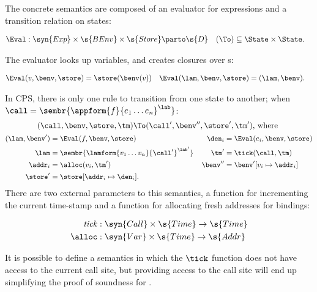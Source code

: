 The concrete semantics are composed of an evaluator for expressions
and a transition relation on states:
\begin{small}\begin{align*}
  \Eval &: \syn{Exp} \times \s{BEnv} \times \s{Store} \parto \s{D}
  &
  (\To) &\subseteq \State \times \State
  \text.
\end{align*}\end{small}The evaluator looks up variables, and creates closures over \lamterm s:
\begin{small}\begin{align*}
  \Eval(v,\benv,\store) &= \store(\benv(v))
  &
  \Eval(\lam,\benv,\store) &= (\lam,\benv)
  \text.
\end{align*}\end{small}In CPS, there is only one rule to transition from one state to another;
when $\call = \sembr{\appform{f}{e_1 \ldots e_n}^\lab}$:
\begin{gather*}
  (\call,\benv,\store,\tm) 
  \To
  (\call',\benv'',\store',\tm')\text{, where }\\
\begin{small}\begin{align*}
  (\lam,\benv') &= \Eval(f,\benv,\store)
  &
  \den_i &= \Eval(e_i,\benv,\store)
  \\
  \lam &= \sembr{\lamform{v_1 \ldots v_n}{\call'}^{\lab'}}
  &
  \tm' &= \tick(\call,\tm)
  \\
  \addr_i &= \alloc(v_i,\tm')
  &
  \benv'' &= \benv'[v_i \mapsto \addr_i]
  \\
  \store' &= \store[\addr_i \mapsto \den_i]
  \text.
\end{align*}\end{small}\end{gather*}
There are two external parameters to this semantics, a function for
incrementing the current time-stamp and a function for allocating
fresh addresses for bindings:
\begin{small}\begin{align*}
  \mathit{tick} &: \syn{Call} \times \s{Time} \to \s{Time}
  \\
  \alloc &: \syn{Var} \times \s{Time} \to \s{Addr}
\end{align*}\end{small}It is possible to define a semantics in which the $\tick$ function
does not have access to the current call site, but providing access to
the call site will end up simplifying the proof of soundness for
\kCFA.


